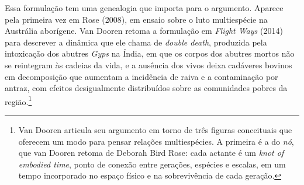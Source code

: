 Essa formulação tem uma genealogia que importa para o argumento. Aparece pela primeira vez em Rose (2008), em ensaio sobre o luto multiespécie na Austrália aborígene. Van Dooren retoma a formulação em \textit{Flight Ways} (2014) para descrever a dinâmica que ele chama de \textit{double death}, produzida pela intoxicação dos abutres \textit{Gyps} na Índia, em que os corpos dos abutres mortos não se reintegram às cadeias da vida, e a ausência dos vivos deixa cadáveres bovinos em decomposição que aumentam a incidência de raiva e a contaminação por antraz, com efeitos desigualmente distribuídos sobre as comunidades pobres da região.\footnote{Van Dooren articula seu argumento em torno de três figuras conceituais que oferecem um modo para pensar relações multiespécies. A primeira é a do \textit{nó}, que van Dooren retoma de Deborah Bird Rose: cada actante é um \textit{knot of embodied time}, ponto de conexão entre gerações, espécies e escalas, em um tempo incorporado no espaço físico e na sobrevivência de cada geração.
}
